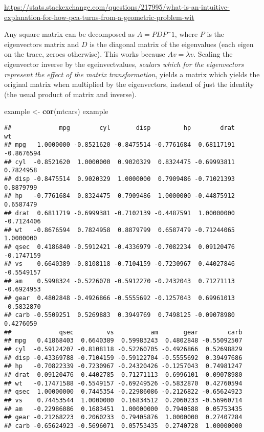 \documentclass[
]{article}
\newenvironment{Shaded}{\begin{snugshade}}{\end{snugshade}}
\newcommand{\KeywordTok}[1]{\textcolor[rgb]{0.13,0.29,0.53}{\textbf{#1}}}
\newcommand{\NormalTok}[1]{#1}
\newcommand{\StringTok}[1]{\textcolor[rgb]{0.31,0.60,0.02}{#1}}
\begin{document}
\url{https://stats.stackexchange.com/questions/217995/what-is-an-intuitive-explanation-for-how-pca-turns-from-a-geometric-problem-wit}

Any square matrix can be decomposed as \(A=PDP^-1\), where \(P\) is the
eigenvectors matrix and \(D\) is the diagonal matrix of the eigenvalues
(each eigen on the trace, zeroes otherwise). This works because
\(Av=\lambda{v}\). Scaling the eigenvector inverse by the
egeinvectvalues, \emph{scalars which for the eigenvectors represent the
effect of the matrix transformation}, yields a matrix which yields the
original matrix when multiplied by the eigenvectors, instead of just the
identity (the usual product of matrix and inverse).

\begin{Shaded}
\begin{Highlighting}[]
\NormalTok{example <-}\StringTok{ }\KeywordTok{cor}\NormalTok{(mtcars)}
\NormalTok{example}
\end{Highlighting}
\end{Shaded}

\begin{verbatim}
##             mpg        cyl       disp         hp        drat         wt
## mpg   1.0000000 -0.8521620 -0.8475514 -0.7761684  0.68117191 -0.8676594
## cyl  -0.8521620  1.0000000  0.9020329  0.8324475 -0.69993811  0.7824958
## disp -0.8475514  0.9020329  1.0000000  0.7909486 -0.71021393  0.8879799
## hp   -0.7761684  0.8324475  0.7909486  1.0000000 -0.44875912  0.6587479
## drat  0.6811719 -0.6999381 -0.7102139 -0.4487591  1.00000000 -0.7124406
## wt   -0.8676594  0.7824958  0.8879799  0.6587479 -0.71244065  1.0000000
## qsec  0.4186840 -0.5912421 -0.4336979 -0.7082234  0.09120476 -0.1747159
## vs    0.6640389 -0.8108118 -0.7104159 -0.7230967  0.44027846 -0.5549157
## am    0.5998324 -0.5226070 -0.5912270 -0.2432043  0.71271113 -0.6924953
## gear  0.4802848 -0.4926866 -0.5555692 -0.1257043  0.69961013 -0.5832870
## carb -0.5509251  0.5269883  0.3949769  0.7498125 -0.09078980  0.4276059
##             qsec         vs          am       gear        carb
## mpg   0.41868403  0.6640389  0.59983243  0.4802848 -0.55092507
## cyl  -0.59124207 -0.8108118 -0.52260705 -0.4926866  0.52698829
## disp -0.43369788 -0.7104159 -0.59122704 -0.5555692  0.39497686
## hp   -0.70822339 -0.7230967 -0.24320426 -0.1257043  0.74981247
## drat  0.09120476  0.4402785  0.71271113  0.6996101 -0.09078980
## wt   -0.17471588 -0.5549157 -0.69249526 -0.5832870  0.42760594
## qsec  1.00000000  0.7445354 -0.22986086 -0.2126822 -0.65624923
## vs    0.74453544  1.0000000  0.16834512  0.2060233 -0.56960714
## am   -0.22986086  0.1683451  1.00000000  0.7940588  0.05753435
## gear -0.21268223  0.2060233  0.79405876  1.0000000  0.27407284
## carb -0.65624923 -0.5696071  0.05753435  0.2740728  1.00000000
\end{verbatim}
\end{document}
